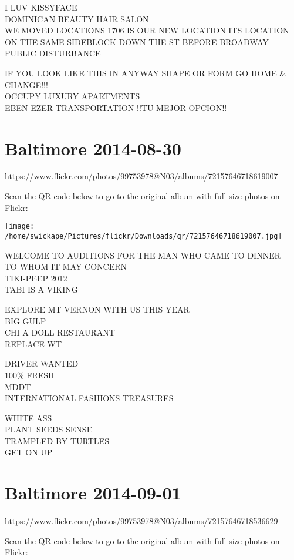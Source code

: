 \documentclass[10pt,letterpaper]{article}
\begin{document}
I LUV KISSYFACE\\
DOMINICAN BEAUTY HAIR SALON\\
WE MOVED LOCATIONS 1706 IS OUR NEW LOCATION ITS LOCATION ON THE SAME SIDEBLOCK DOWN THE ST BEFORE BROADWAY\\
PUBLIC DISTURBANCE

IF YOU LOOK LIKE THIS IN ANYWAY SHAPE OR FORM GO HOME \& CHANGE!!!\\
OCCUPY LUXURY APARTMENTS\\
EBEN{-}EZER TRANSPORTATION  !!TU MEJOR OPCION!!


\section*{Baltimore 2014-08-30}

\url{https://www.flickr.com/photos/99753978@N03/albums/72157646718619007}

Scan the QR code below to go to the original album with full-size photos on Flickr:

\texttt{[image: /home/swickape/Pictures/flickr/Downloads/qr/72157646718619007.jpg]}


WELCOME TO AUDITIONS FOR THE MAN WHO CAME TO DINNER\\
TO WHOM IT MAY CONCERN\\
TIKI{-}PEEP 2012\\
TABI IS A VIKING

EXPLORE MT VERNON WITH US THIS YEAR\\
BIG GULP\\
CHI A DOLL RESTAURANT\\
REPLACE WT

DRIVER WANTED\\
100\% FRESH\\
MDDT\\
INTERNATIONAL FASHIONS TREASURES

WHITE ASS\\
PLANT SEEDS SENSE\\
TRAMPLED BY TURTLES\\
GET ON UP


\section*{Baltimore 2014-09-01}

\url{https://www.flickr.com/photos/99753978@N03/albums/72157646718536629}

Scan the QR code below to go to the original album with full-size photos on Flickr:
\end{document}
